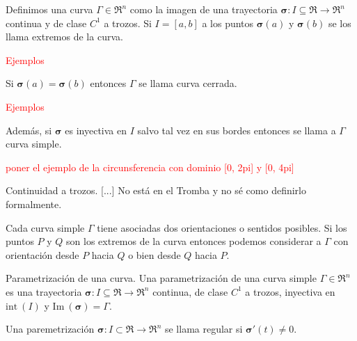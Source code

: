 \begin{definition}
    Definimos una curva $\Gamma\in\Re^n$ como la imagen de una trayectoria $\boldsymbol{\sigma}:I\subseteq\Re\to\Re^n$ continua y de clase $C^1$ a trozos. Si $I=[a,b]$ a los puntos $\boldsymbol{\sigma}(a)$ y $\boldsymbol{\sigma}(b)$ se los llama extremos de la curva.\final

    \textcolor{red}{Ejemplos}

    Si $\boldsymbol{\sigma}(a)=\boldsymbol{\sigma}(b)$ entonces $\Gamma$ se llama curva cerrada.

    \textcolor{red}{Ejemplos}

    Adem\'as, si $\boldsymbol{\sigma}$ es inyectiva en $I$ salvo tal vez en sus bordes entonces se llama a $\Gamma$ curva simple.

    \textcolor{red}{poner el ejemplo de la circunsferencia con dominio [0, 2pi] y [0, 4pi]}
\end{definition}

\begin{definition}
    Continuidad a trozos. [...] No est\'a en el Tromba y no s\'e como definirlo formalmente.\final
\end{definition}

Cada curva simple $\Gamma$ tiene asociadas dos orientaciones o sentidos posibles. Si los puntos $P$ y $Q$ son los extremos de la curva entonces podemos considerar a $\Gamma$ con orientaci\'on desde $P$ hacia $Q$ o bien desde $Q$ hacia $P$.

\begin{definition}
    Parametrizaci\'on de una curva. Una parametrizaci\'on de una curva simple $\Gamma\in\Re^n$ es una trayectoria $\boldsymbol{\sigma}:I\subseteq\Re\to\Re^n$ continua, de clase $C^1$ a trozos, inyectiva en $\text{int}\:(I)$ y $\text{Im}\:(\boldsymbol{\sigma})=\Gamma$.\final
\end{definition}

\begin{definition}
    Una paremetrizaci\'on $\boldsymbol{\sigma}:I\subset\Re\to\Re^n$ se llama regular si $\boldsymbol{\sigma}'(t)\neq0$.\final
\end{definition}